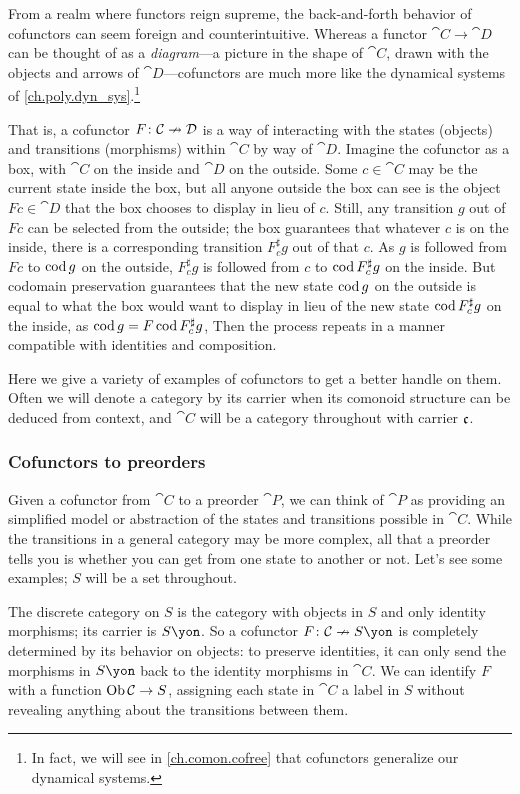 \documentclass[Book-Poly]{subfiles}
\begin{document}
From a realm where functors reign supreme, the back-and-forth behavior of cofunctors can seem foreign and  counterintuitive.
Whereas a functor $\cat{C}\to\cat{D}$ can be thought of as a \emph{diagram}---a picture in the shape of $\cat{C}$, drawn with the objects and arrows of $\cat{D}$---cofunctors are much more like the dynamical systems of \cref{ch.poly.dyn_sys}.\footnote{In fact, we will see in \cref{ch.comon.cofree} that cofunctors generalize our dynamical systems.}

That is, a cofunctor $F\colon\mathcal{C}\nrightarrow\mathcal{D}$ is a way of interacting with the states (objects) and transitions (morphisms) within $\cat{C}$ by way of $\cat{D}$.
Imagine the cofunctor as a box, with $\cat{C}$ on the inside and $\cat{D}$ on the outside.
Some $c\in\cat{C}$ may be the current state inside the box, but all anyone outside the box can see is the object $Fc\in\cat{D}$ that the box chooses to display in lieu of $c$.
Still, any transition $g$ out of $Fc$ can be selected from the outside; the box guarantees that whatever $c$ is on the inside, there is a corresponding transition $F^\sharp_c g$ out of that $c$.
As $g$ is followed from $Fc$ to $\operatorname{cod} g$ on the outside, $F^\sharp_c g$ is followed from $c$ to $\operatorname{cod} F^\sharp_c g$ on the inside.
But codomain preservation guarantees that the new state $\operatorname{cod} g$ on the outside is equal to what the box would want to display in lieu of the new state $\operatorname{cod} F^\sharp_c g$ on the inside, as $\operatorname{cod} g=F\operatorname{cod} F^\sharp_c g$,
Then the process repeats in a manner compatible with identities and composition.

Here we give a variety of examples of cofunctors to get a better handle on them.
Often we will denote a category by its carrier when its comonoid structure can be deduced from context, and $\cat{C}$ will be a category throughout with carrier $\mathfrak{c}$.

\subsubsection{Cofunctors to preorders}

Given a cofunctor from $\cat{C}$ to a preorder $\cat{P}$, we can think of $\cat{P}$ as providing an simplified model or abstraction of the states and transitions possible in $\cat{C}$.
While the transitions in a general category may be more complex, all that a preorder tells you is whether you can get from one state to another or not.
Let's see some examples; $S$ will be a set throughout.

\begin{example} \label{ex.cof_to_discrete}
The discrete category on $S$ is the category with objects in $S$ and only identity morphisms; its carrier is $S\yon$.
So a cofunctor $F\colon\cat C\cof S\yon$ is completely determined by its behavior on objects: to preserve identities, it can only send the morphisms in $S\yon$ back to the identity morphisms in $\cat C$.
We can identify $F$ with a function $\operatorname{Ob}\mathcal{C}\to S$, assigning each state in $\cat C$ a label in $S$ without revealing anything about the transitions between them.
\end{example}
\end{document}
